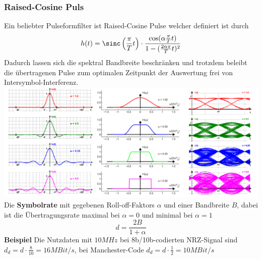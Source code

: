 \subsubsection{Raised-Cosine Puls}
Ein beliebter Pulseformfilter ist Raised-Cosine Pulse  welcher definiert ist durch 
\[
h(t) = \sinc\left(\frac{\pi}{T}t\right)\cdot\frac{\cos(\alpha\frac{\pi}{T}t)}{1- (\frac{2\alpha\pi}{T}t)^2}
\]
Dadurch lassen sich die spektral Bandbreite beschränken und trotzdem beleibt die übertragenen Pulse zum optimalen Zeitpunkt der Auswertung frei von Intersymbol-Interferenz.
\includegraphics[width=\columnwidth]{Images/raised-cosine_pulse}
Die \textbf{Symbolrate} mit gegebenen Roll-off-Faktors $\alpha$ und einer Bandbreite $B$, dabei ist die Übertragungsrate maximal bei $\alpha=0$ und minimal bei $\alpha=1$ 
\[
d = \frac{2B}{1 + \alpha}
\]
\textbf{Beispiel}
Die Nutzdaten mit $10MHz$ bei 8b/10b-codierten NRZ-Signal sind $d_d = d \cdot \frac{8}{10} = 16MBit/s$, bei Manchester-Code $d_d = d \cdot \frac{1}{2} = 10MBit/s$